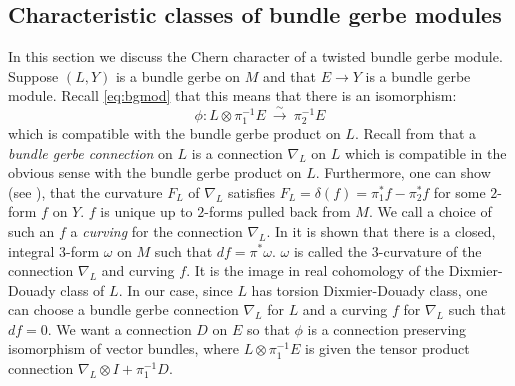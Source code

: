 \documentclass[a4paper,reqno]{amsart}
\theoremstyle{plain}
\theoremstyle{definition}
\theoremstyle{remark}
\numberwithin{equation}{section}
\numberwithin{figure}{section}
\newcommand{\<}{\langle}
\renewcommand{\>}{\rangle}
\begin{document}
\subsection{Characteristic classes of bundle gerbe modules}
In this section we discuss the Chern character of a twisted
bundle gerbe module.
Suppose $(L,Y)$ is a bundle gerbe on $M$ and
that $E\to Y$ is a bundle gerbe module. Recall \eqref{eq:bgmod}
that this means that there is an isomorphism:
$$
\phi \colon L\otimes \pi_1^{-1}E \ \stackrel{\sim}{\to}\
\pi_2^{-1}E
$$
which is compatible with the bundle gerbe product
on $L$.  Recall from \cite{Mur} that a \emph{bundle
gerbe connection} on $L$ is a connection $\nabla_L$
on $L$ which is compatible in the obvious sense with
the bundle gerbe product on $L$.  Furthermore, one
can show (see \cite{Mur}), that the curvature
$F_L$ of $\nabla_L$ satisfies $F_L = \delta(f) = \pi_1^*f
- \pi_2^*f$ for some $2$-form $f$ on $Y$.  $f$ is unique
up to $2$-forms pulled back from $M$.  We call a choice
of such an $f$ a \emph{curving} for the connection
$\nabla_L$.  In \cite{Mur} it is shown that there is
a closed, integral $3$-form $\omega$ on $M$ such
that $df = \pi^* \omega$.  $\omega$ is called the
$3$-curvature of the connection $\nabla_L$ and
curving $f$.  It is the image in real cohomology
of the Dixmier-Douady class of $L$.  In our case,
since $L$ has torsion Dixmier-Douady class, one
can choose a bundle gerbe connection $\nabla_L$
for $L$ and a curving $f$ for $\nabla_L$ such that
$df =0$.
We want a connection $D$ on
$E$ so that $\phi$ is a connection preserving
isomorphism of vector bundles, where $L\otimes
\pi_1^{-1}E$ is given the tensor product connection
$\nabla_L \otimes I + \pi_1^{-1}D$.
\end{document}
